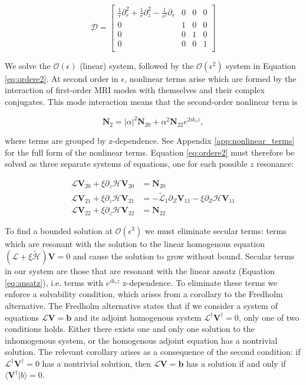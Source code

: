 \documentclass{emulateapj}
\newcommand{\beq}{\begin{equation}}
\newcommand{\eeq}{\end{equation}}
\begin{document}
\beq
\mathcal{D} = \left[\begin{matrix}
\frac{1}{r}\partial_r^2 + \frac{1}{r}\partial_z^2 - \frac{1}{r^2}\partial_r & 0 & 0 & 0 \\
0 & 1 & 0 & 0 \\
0 & 0 & 1 & 0 \\
0 & 0 & 0 & 1 \\
\end{matrix}\right]
\eeq

We solve the $\mathcal{O}(\epsilon)$ (linear) system, followed by the $\mathcal{O}(\epsilon^2)$ system in Equation \ref{eq:ordere2}. At second order in $\epsilon$, nonlinear terms arise which are formed by the interaction of first-order MRI modes with themselves and their complex conjugates. This mode interaction means that the second-order nonlinear term is 

\beq
\mathbf{N}_2 = |\alpha|^2 \mathbf{N}_{20} + \alpha^2 \mathbf{N}_{22} e^{2 i k_c z},
\eeq

where terms are grouped by z-dependence. See Appendix \ref{app:nonlinear_terms} for the full form of the nonlinear terms. Equation \ref{eq:ordere2} must therefore be solved as three separate systems of equations, one for each possible $z$ resonance: 

\begin{align}
\mathcal{L}\mathbf{V}_{20} + \xi \partial_z \mathcal{H} \mathbf{V}_{20} & = \mathbf{N}_{20}\\
\mathcal{L}\mathbf{V}_{21} + \xi \partial_z \mathcal{H} \mathbf{V}_{21} & = - \widetilde{\mathcal{L}}_1 \partial_Z \mathbf{V}_{11} - \xi \partial_Z \mathcal{H} \mathbf{V}_{11} \\
\mathcal{L}\mathbf{V}_{22} + \xi \partial_z \mathcal{H} \mathbf{V}_{22} & = \mathbf{N}_{22}
\end{align}



To find a bounded solution at $\mathcal{O}(\epsilon^3)$ we must eliminate secular terms: terms which are resonant with the solution to the linear homogenous equation $(\mathcal{L} + \xi \widetilde{\mathcal{H}}) \mathbf{V} = 0$ and cause the solution to grow without bound. Secular terms in our system are those that are resonant with the linear ansatz (Equation \ref{eq:ansatz}), i.e. terms with $e^{i k_c z}$ z-dependence. To eliminate these terms we enforce a solvability condition, which arises from a corollary to the Fredholm alternative. The Fredholm alternative states that if we consider a system of equations $\mathcal{L} \mathbf{V} = \mathbf{b}$ and its adjoint homogenous system $\mathcal{L}^\dagger \mathbf{V}^\dagger = 0$, only one of two conditions holds. Either there exists one and only one solution to the inhomogenous system, or the homogenous adjoint equation has a nontrivial solution. The relevant corollary arises as a consequence of the second condition: if $\mathcal{L}^\dagger \mathbf{V}^\dagger = 0$ has a nontrivial solution, then $\mathcal{L} \mathbf{V} = \mathbf{b}$ has a solution if and only if $\langle \mathbf{V}^\dagger | b \rangle = 0$. 
\end{document}
